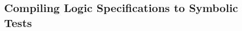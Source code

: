%
%



\subsection{Compiling \jsil Logic Specifications to Symbolic Tests}
\label{specs:to:symbolic:tests}


